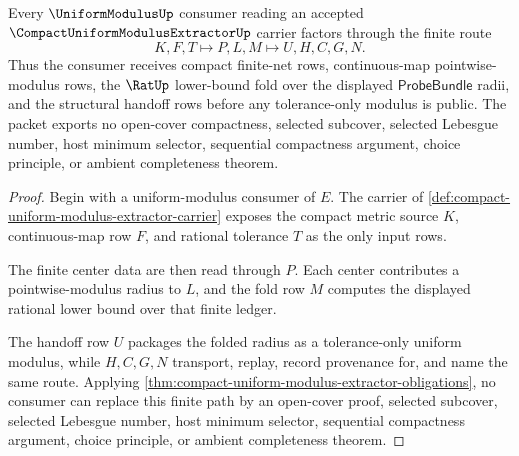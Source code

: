 \begin{theorem}
\label{thm:compact-uniform-modulus-extractor-finite-fold-handoff}
Every $\UniformModulusUp$ consumer reading an accepted $\CompactUniformModulusExtractorUp$ carrier factors through the finite route
$$
K,F,T \longmapsto P,L,M \longmapsto U,H,C,G,N .
$$
Thus the consumer receives compact finite-net rows, continuous-map pointwise-modulus rows, the $\RatUp$ lower-bound fold over the displayed $\mathsf{ProbeBundle}$ radii, and the structural handoff rows before any tolerance-only modulus is public. The packet exports no open-cover compactness, selected subcover, selected Lebesgue number, host minimum selector, sequential compactness argument, choice principle, or ambient completeness theorem.
\end{theorem}
\begin{proof}
Begin with a uniform-modulus consumer of $E$. The carrier of \autoref{def:compact-uniform-modulus-extractor-carrier} exposes the compact metric source $K$, continuous-map row $F$, and rational tolerance $T$ as the only input rows.

The finite center data are then read through $P$. Each center contributes a pointwise-modulus radius to $L$, and the fold row $M$ computes the displayed rational lower bound over that finite ledger.

The handoff row $U$ packages the folded radius as a tolerance-only uniform modulus, while $H,C,G,N$ transport, replay, record provenance for, and name the same route. Applying \autoref{thm:compact-uniform-modulus-extractor-obligations}, no consumer can replace this finite path by an open-cover proof, selected subcover, selected Lebesgue number, host minimum selector, sequential compactness argument, choice principle, or ambient completeness theorem.
\end{proof}


